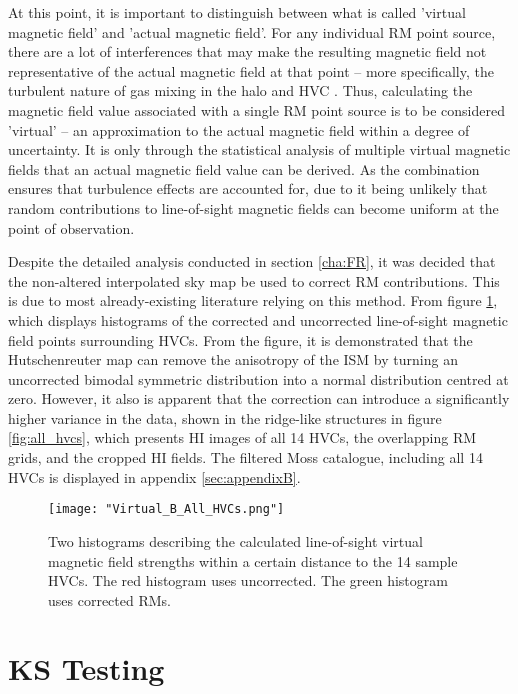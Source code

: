 At this point, it is important to distinguish between what is called 'virtual magnetic field' and 'actual magnetic field'. For any individual RM point source, there are a lot of interferences that may make the resulting magnetic field not representative of the actual magnetic field at that point – more specifically, the turbulent nature of gas mixing in the halo and HVC \citep{ID69, ID30, ID16}. Thus, calculating the magnetic field value associated with a single RM point source is to be considered 'virtual' – an approximation to the actual magnetic field within a degree of uncertainty. It is only through the statistical analysis of multiple virtual magnetic fields that an actual magnetic field value can be derived. As the combination ensures that turbulence effects are accounted for, due to it being unlikely that random contributions to line-of-sight magnetic fields can become uniform at the point of observation.


Despite the detailed analysis conducted in section \ref{cha:FR}, it was decided that the non-altered interpolated sky map be used to correct RM contributions. This is due to most already-existing literature relying on this method. From figure \ref{fig:anisotropy}, which displays histograms of the corrected and uncorrected line-of-sight magnetic field points surrounding HVCs. From the figure, it is demonstrated that the Hutschenreuter map can remove the anisotropy of the ISM by turning an uncorrected bimodal symmetric distribution into a normal distribution centred at zero. However, it also is apparent that the correction can introduce a significantly higher variance in the data, shown in the ridge-like structures in figure \ref{fig:all_hvcs}, which presents HI images of all 14 HVCs, the overlapping RM grids, and the cropped HI fields. The filtered Moss catalogue, including all 14 HVCs is displayed in appendix \ref{sec:appendixB}.

\begin{figure}
    \texttt{[image: "Virtual\_B\_All\_HVCs.png"]}
    \centering
    \caption{Two histograms describing the calculated line-of-sight virtual magnetic field strengths within a certain distance to the 14 sample HVCs. The red histogram uses uncorrected. The green histogram uses corrected RMs.}
    \label{fig:anisotropy}
\end{figure}


\section{KS Testing}
\label{sec:KStest}

